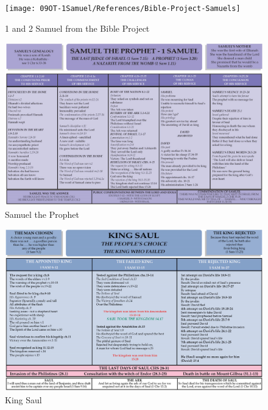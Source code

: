 
\newpage
\begin{figure}
\begin{center}
\texttt{[image: 09OT-1Samuel/References/Bible-Project-Samuels]}
\caption[1 and 2 Samuel from the Bible Project]{1 and 2 Samuel from the Bible Project}
\label{fig:1 and 2 Samuel from the Bible Project}
\end{center}
\end{figure}

\newpage
\begin{figure}
\begin{center}
\includegraphics[scale=0.6, angle=90]{09OT-1Samuel/References/Samuel-the-Prophet}
\caption[Samuel the Prophet]{Samuel the Prophet}
\label{fig:Samuel the Prophet}
\end{center}
\end{figure}

\newpage
\begin{figure}
\begin{center}
\includegraphics[scale=0.6, angle=90]{09OT-1Samuel/References/King-Saul}
\caption[King Saul]{King Saul}
\label{fig:King Saul}
\end{center}
\end{figure}

